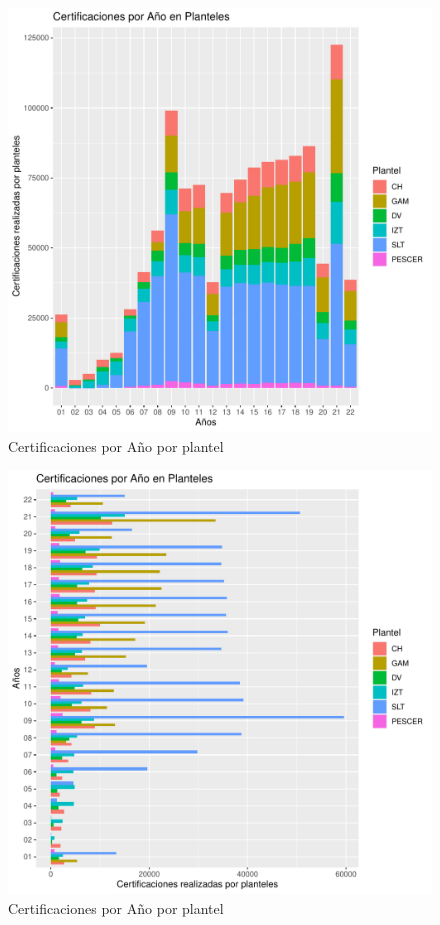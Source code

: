 \documentclass[12pt]{article}
\begin{document}
\begin{figure}
\centering
\includegraphics[scale=0.45]{Graficas/ggplotBarplotAnhoPlantel.pdf}
\caption{Certificaciones por A\~no por plantel}
\label{Fig.Cert.Anho-Plantel}
\end{figure}

\begin{figure}
\centering
\includegraphics[scale=0.45]{Graficas/ggplotBarplotAnhoPlantel2.pdf}
\caption{Certificaciones por A\~no por plantel}
\label{Fig.Cert.Anho-Plantel2}
\end{figure}
\end{document}
